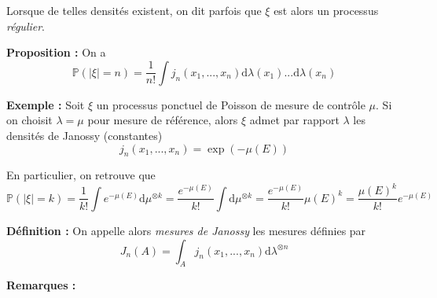 \documentclass[12pt]{article}
\begin{document}
Lorsque de telles densités existent, on dit parfois que $ \xi $ est alors un processus \textit{régulier}.

\textbf{Proposition :} On a $$ \mathbb P(|\xi| = n ) = \frac{1}{n!} \int j_n(x_1,...,x_n) \mathrm d\lambda(x_1)... \mathrm d\lambda(x_n)$$

\textbf{Exemple :} Soit $ \xi $ un processus ponctuel de Poisson de mesure de contrôle $ \mu $. Si on choisit $ \lambda = \mu $ pour mesure de référence, alors $ \xi $ admet par rapport $ \lambda $ les densités de Janossy (constantes) $$ j_n(x_1,...,x_n) = \exp(- \mu(E)) $$

En particulier, on retrouve que $$ \mathbb P(|\xi| = k) = \frac{1}{k!} \int e^{-\mu(E)} \mathrm d \mu^{\otimes k} = \frac{e^{-\mu(E)}}{k!} \int \mathrm d \mu^{\otimes k} = \frac{e^{-\mu(E)}}{k!} \mu(E)^k = \frac{\mu(E)^k}{k!} e^{-\mu(E)}$$

\textbf{Définition :} On appelle alors \textit{mesures de Janossy} les mesures définies par $$ J_n(A) = \int_A j_n(x_1,...,x_n) \mathrm d \lambda^{\otimes n} $$

\textbf{Remarques :} 
\end{document}
